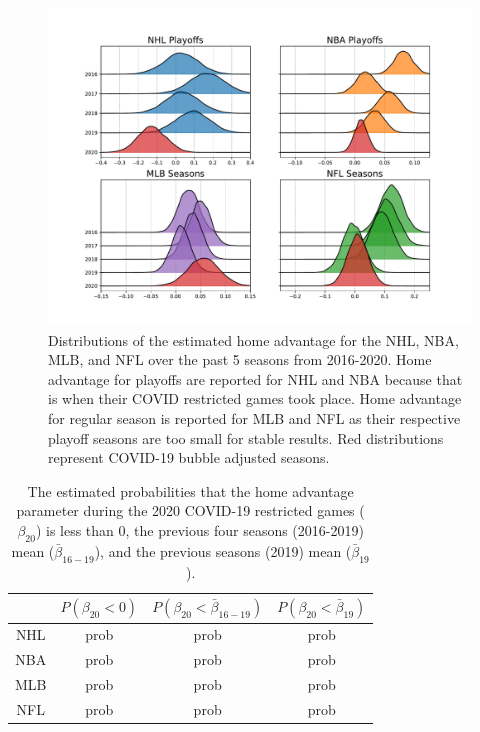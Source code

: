 \begin{figure}
	\centering
	\includegraphics[width=\textwidth]{figures/Figure_2.pdf}
	\caption{Distributions of the estimated home advantage for the NHL, NBA, MLB, and NFL over the past 5 seasons from 2016-2020. Home advantage for playoffs are reported for NHL and NBA because that is when their COVID restricted games took place. Home advantage for regular season is reported for MLB and NFL as their respective playoff seasons are too small for stable results. Red distributions represent COVID-19 bubble adjusted seasons.}
	\label{fig:ha_main}
\end{figure}

\begin{table}
	\centering
	\begin{tabular}{c@{\hskip0.35in}c@{\hskip0.35in}c@{\hskip 0.35in}c}
		\toprule
		& \boldmath$P(\beta_{20} < 0)$ & \boldmath$P(\beta_{20} < \bar{\beta}_{16-19})$ & \boldmath$P(\beta_{20} < \bar{\beta}_{19})$ \\
		\midrule
		NHL&prob&prob&prob \\
		\midrule
		NBA&prob&prob&prob \\
		\midrule
		MLB&prob&prob&prob \\
		\midrule
		NFL&prob&prob&prob \\
		\bottomrule
	\end{tabular}
	\caption{The estimated probabilities that the home advantage parameter during the 2020 COVID-19 restricted games ($\beta_{20}$) is less than 0, the previous four seasons (2016-2019) mean ($\bar{\beta}_{16-19}$), and the previous seasons (2019) mean ($\bar{\beta}_{19}$).}\label{tab:ha_probs}
\end{table}